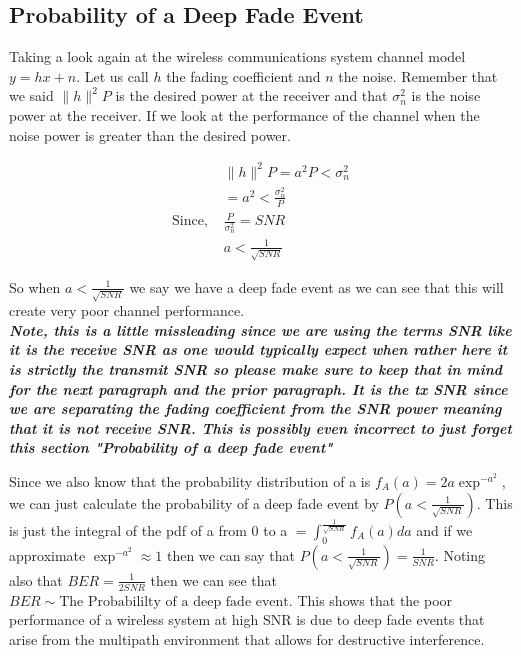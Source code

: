          \subsection{Probability of a Deep Fade Event}
            Taking a look again at the wireless communications system channel
            model $y=hx+n$.  Let us call $h$ the fading coefficient and $n$ the
            noise.  Remember that we said $\|h\|^{2}P$ is the desired power at
            the receiver and that $\sigma_n^{2}$ is the noise power at the
            receiver.  If we look at the performance of the channel when the
            noise power is greater than the desired power.

            \begin{center}
            \begin{align}
               &\|h\|^{2}P=a^{2}P<\sigma_n^{2} \\[10pt]
               &=a^{2} < \frac{\sigma_n^{2}}{P} \\[10pt]
               \text{Since, } &\frac{P}{\sigma_n^{2}} = SNR \\[10pt]
               &a<\frac{1}{\sqrt{SNR}}
            \end{align}
            \end{center}

            So when $a<\frac{1}{\sqrt{SNR}}$ we say we have a deep fade event
            as we can see that this will create very poor channel
            performance.\\

            \vspace{10pt}
            \textbf{\emph{
            Note, this is a little missleading since we are using the terms SNR
            like it is the receive SNR as one would typically expect when
            rather here it is strictly the transmit SNR so please make sure to
            keep that in mind for the next paragraph and the prior paragraph.
            It is the tx SNR since we are separating the fading coefficient
            from the SNR power meaning that it is not receive SNR.
            This is possibly even incorrect to just forget this section
            "Probability of a deep fade event"\\}}

            \vspace{10pt}

            Since we also know that the probability distribution of a is
            $f_A(a)=2a\exp^{-a^{2}}$, we can just calculate the probability of
            a deep fade event by $P(a<\frac{1}{\sqrt{SNR}})$.  This is just the
            integral of the pdf of a from 0 to a
            $=\int_{0}^{\frac{1}{\sqrt{SNR}}}f_A(a)da$ and if we approximate
            $\exp^{-a^{2}}\approx 1$ then we can say that
            $P(a<\frac{1}{\sqrt{SNR}})=\frac{1}{SNR}$.  Noting also that
            $BER=\frac{1}{2SNR}$ then we can see that $BER\sim \text{The
            Probabililty of a deep fade event}$.  This shows that the poor
            performance of a wireless system at high SNR is due to deep fade
            events that arise from the multipath environment that allows for
            destructive interference.

